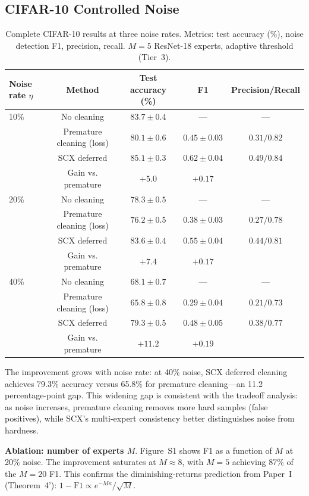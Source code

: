 \documentclass[11pt]{article}
\begin{document}
\subsection{CIFAR-10 Controlled Noise}

\begin{table}[h]
\centering
\caption{Complete CIFAR-10 results at three noise rates. Metrics: test accuracy (\%), noise detection F1, precision, recall. $M=5$ ResNet-18 experts, adaptive threshold (Tier~3).}
\label{tab:cifar_full}
\begin{tabular}{lcccc}
\hline
Noise rate $\eta$ & Method & Test accuracy (\%) & F1 & Precision/Recall \\
\hline
10\% & No cleaning & $83.7 \pm 0.4$ & --- & --- \\
 & Premature cleaning (loss) & $80.1 \pm 0.6$ & $0.45 \pm 0.03$ & $0.31/0.82$ \\
 & SCX deferred & $85.1 \pm 0.3$ & $0.62 \pm 0.04$ & $0.49/0.84$ \\
 & Gain vs. premature & $+5.0$ & $+0.17$ & \\
\hline
20\% & No cleaning & $78.3 \pm 0.5$ & --- & --- \\
 & Premature cleaning (loss) & $76.2 \pm 0.5$ & $0.38 \pm 0.03$ & $0.27/0.78$ \\
 & SCX deferred & $83.6 \pm 0.4$ & $0.55 \pm 0.04$ & $0.44/0.81$ \\
 & Gain vs. premature & $+7.4$ & $+0.17$ & \\
\hline
40\% & No cleaning & $68.1 \pm 0.7$ & --- & --- \\
 & Premature cleaning (loss) & $65.8 \pm 0.8$ & $0.29 \pm 0.04$ & $0.21/0.73$ \\
 & SCX deferred & $79.3 \pm 0.5$ & $0.48 \pm 0.05$ & $0.38/0.77$ \\
 & Gain vs. premature & $+11.2$ & $+0.19$ & \\
\hline
\end{tabular}
\end{table}

The improvement grows with noise rate: at 40\% noise, SCX deferred cleaning achieves 79.3\% accuracy versus 65.8\% for premature cleaning---an 11.2 percentage-point gap. This widening gap is consistent with the tradeoff analysis: as noise increases, premature cleaning removes more hard samples (false positives), while SCX's multi-expert consistency better distinguishes noise from hardness.

\textbf{Ablation: number of experts $M$}. Figure~S1 shows F1 as a function of $M$ at 20\% noise. The improvement saturates at $M \approx 8$, with $M=5$ achieving 87\% of the $M=20$ F1. This confirms the diminishing-returns prediction from Paper~I (Theorem~4'): $1-\text{F1} \propto e^{-M\kappa}/\sqrt{M}$.
\end{document}

